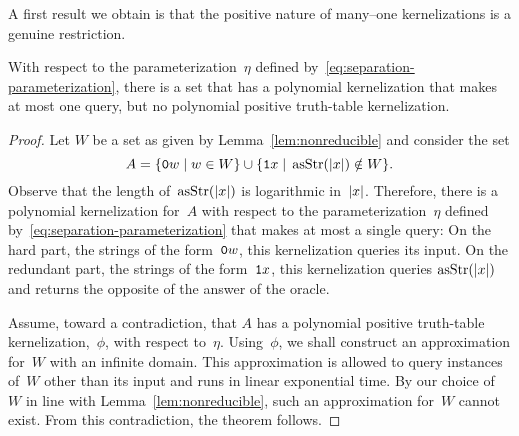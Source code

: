 A first result we obtain is that the positive nature of many--one kernelizations is a genuine restriction.
\begin{theorem}
\label{thm:hpositive}%
  With respect to the parameterization~$\eta$ defined by~\eqref{eq:separation-parameterization}, there is a set that has a polynomial kernelization that makes at most one query, but no polynomial positive truth-table kernelization.
\end{theorem}
\begin{proof}
  Let $W$ be a set as given by Lemma~\ref{lem:nonreducible} and consider the set
  \begin{equation*}
    A = \{\textnormal{\texttt{0}}w \;|\; w \in W\} \cup \{\textnormal{\texttt{1}}x \;|\; \operatorname{asStr}({\lvert x\rvert}) \notin W\}.
  \end{equation*}
  Observe that the length of~$\operatorname{asStr}({\lvert x\rvert})$ is logarithmic in~${\lvert x\rvert}$.
  Therefore, there is a polynomial kernelization for~$A$ with respect to the parameterization~$\eta$ defined by~\eqref{eq:separation-parameterization} that makes at most a single query:
  On the hard part, the strings of the form~$\textnormal{\texttt{0}}w$, this kernelization queries its input.
  On the redundant part, the strings of the form~$\textnormal{\texttt{1}}x$, this kernelization queries $\operatorname{asStr}({\lvert x\rvert})$ and returns the opposite of the answer of the oracle.

  Assume, toward a contradiction, that $A$ has a polynomial positive truth-table kernelization,~$\phi$, with respect to~$\eta$.
  Using~$\phi$, we shall construct an approximation for~$W$ with an infinite domain.
  This approximation is allowed to query instances of~$W$ other than its input and runs in linear exponential time.
  By our choice of~$W$ in line with Lemma~\ref{lem:nonreducible}, such an approximation for~$W$ cannot exist.
  From this contradiction, the theorem follows.


\end{proof}
